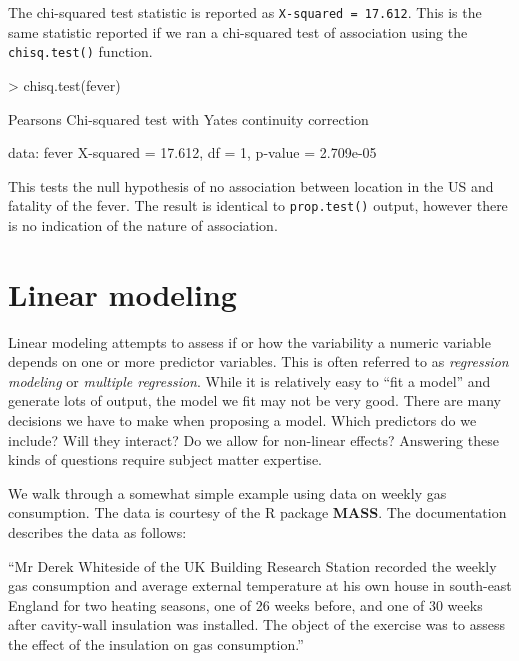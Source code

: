 \documentclass[
]{book}
\newenvironment{Shaded}{\begin{snugshade}}{\end{snugshade}}
\newcommand{\DecValTok}[1]{\textcolor[rgb]{0.00,0.00,0.81}{#1}}
\newcommand{\FloatTok}[1]{\textcolor[rgb]{0.00,0.00,0.81}{#1}}
\newcommand{\FunctionTok}[1]{\textcolor[rgb]{0.00,0.00,0.00}{#1}}
\newcommand{\NormalTok}[1]{#1}
\newcommand{\OtherTok}[1]{\textcolor[rgb]{0.56,0.35,0.01}{#1}}
\newcommand{\SpecialCharTok}[1]{\textcolor[rgb]{0.00,0.00,0.00}{#1}}
\newcommand{\StringTok}[1]{\textcolor[rgb]{0.31,0.60,0.02}{#1}}
\begin{document}
The chi-squared test statistic is reported as \texttt{X-squared\ =\ 17.612}. This is the same statistic reported if we ran a chi-squared test of association using the \texttt{chisq.test()} function.

\begin{Shaded}
\begin{Highlighting}[]
\SpecialCharTok{\textgreater{}} \FunctionTok{chisq.test}\NormalTok{(fever)}

\NormalTok{    Pearson}\StringTok{\textquotesingle{}s Chi{-}squared test with Yates\textquotesingle{}}\NormalTok{ continuity correction}

\NormalTok{data}\SpecialCharTok{:}\NormalTok{  fever}
\NormalTok{X}\SpecialCharTok{{-}}\NormalTok{squared }\OtherTok{=} \FloatTok{17.612}\NormalTok{, df }\OtherTok{=} \DecValTok{1}\NormalTok{, p}\SpecialCharTok{{-}}\NormalTok{value }\OtherTok{=} \FloatTok{2.709e{-}05}
\end{Highlighting}
\end{Shaded}

This tests the null hypothesis of no association between location in the US and fatality of the fever. The result is identical to \texttt{prop.test()} output, however there is no indication of the nature of association.

\hypertarget{linear-modeling}{%
\section{Linear modeling}\label{linear-modeling}}

Linear modeling attempts to assess if or how the variability a numeric variable depends on one or more predictor variables. This is often referred to as \emph{regression modeling} or \emph{multiple regression}. While it is relatively easy to ``fit a model'' and generate lots of output, the model we fit may not be very good. There are many decisions we have to make when proposing a model. Which predictors do we include? Will they interact? Do we allow for non-linear effects? Answering these kinds of questions require subject matter expertise.

We walk through a somewhat simple example using data on weekly gas consumption. The data is courtesy of the R package \textbf{MASS}\citep{MASS}. The documentation describes the data as follows:

``Mr Derek Whiteside of the UK Building Research Station recorded the weekly gas consumption and average external temperature at his own house in south-east England for two heating seasons, one of 26 weeks before, and one of 30 weeks after cavity-wall insulation was installed. The object of the exercise was to assess the effect of the insulation on gas consumption.''
\end{document}
